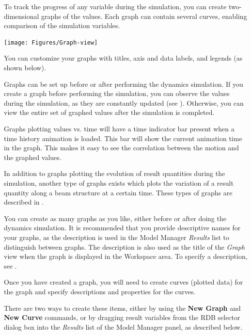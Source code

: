 
To track the progress of any variable during the simulation, you can create
two-dimensional graphs of the values. Each graph can contain several curves,
enabling comparison of the simulation variables.

\begin{center}
  \texttt{[image: Figures/Graph-view]}
\end{center}

You can customize your graphs with titles, axis and data labels, and legends
(as shown below).

Graphs can be set up before or after performing the dynamics simulation.
If you create a graph before performing the simulation, you can observe
the values during the simulation, as they are constantly updated
(see ).
Otherwise, you can view the entire set of graphed values after the simulation
is completed.

Graphs plotting values vs. time will have a time indicator bar present when
a time history animation is loaded. This bar will show the current animation
time in the graph. This makes it easy to see the correlation between the motion
and the graphed values.

In addition to graphs plotting the evolution of result quantities during the
simulation, another type of graphs exists which plots the variation of a result
quantity along a beam structure at a certain time. These types of graphs
are described in .



You can create as many graphs as you like, either before or after doing the
dynamics simulation. It is recommended that you provide descriptive names for
your graphs, as the description is used in the Model Manager {\sl Results}
list to distinguish between graphs. The description is also used as the title
of the {\sl Graph} view when the graph is displayed in the Workspace area.
To specify a description, see .

Once you have created a graph, you will need to create curves (plotted data)
for the graph and specify descriptions and properties for the curves.

There are two ways to create these items, either by using the \textbf{New Graph}
and \textbf{New Curve} commands, or by dragging result variables from the RDB
selector dialog box into the {\sl Results} list of the Model Manager panel,
as described below.

